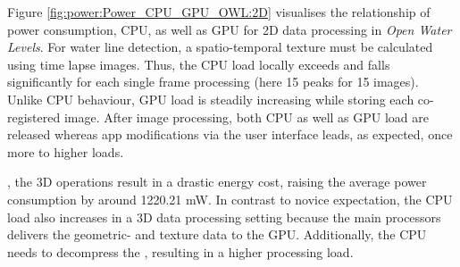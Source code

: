 \documentclass[review]{elsarticle}
\begin{document}
%

Figure \ref{fig:power:Power_CPU_GPU_OWL:2D} visualises the relationship of power consumption, \gls{CPU}, as well as \gls{GPU} for 2D data processing in \textit{Open Water Levels}. For water line detection, a spatio-temporal texture must be calculated using time lapse images. Thus, the CPU load locally exceeds and falls significantly for each single frame processing (here 15 peaks for 15 images). Unlike \gls{CPU} behaviour, \gls{GPU} load is steadily increasing while storing each co-registered image. After image processing, both \gls{CPU} as well as \gls{GPU} load are released whereas app modifications via the user interface leads, as expected, once more to higher loads.

, the 3D operations result in a drastic energy cost, raising the average power consumption by around 1220.21 mW. In contrast to novice expectation, the \gls{CPU} load also increases in a 3D data processing setting because the main processors delivers the geometric- and texture data to the \gls{GPU}. Additionally, the \gls{CPU} needs to decompress the , resulting in a higher processing load.
\end{document}
